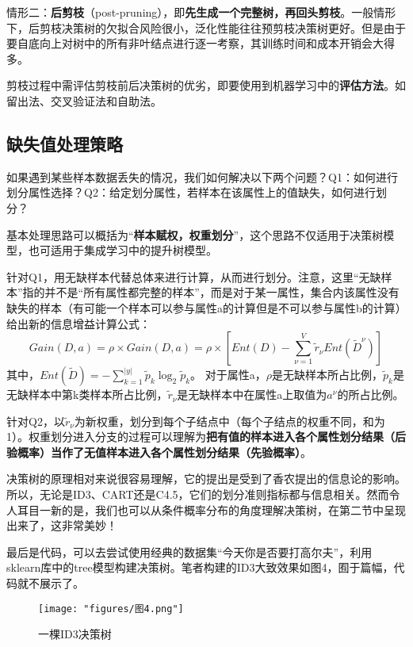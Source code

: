 情形二：\textbf{后剪枝}（post-pruning），即\textbf{先生成一个完整树，再回头剪枝}。一般情形下，后剪枝决策树的欠拟合风险很小，泛化性能往往预剪枝决策树更好。但是由于要自底向上对树中的所有非叶结点进行逐一考察，其训练时间和成本开销会大得多。

剪枝过程中需评估剪枝前后决策树的优劣，即要使用到机器学习中的\textbf{评估方法}。如留出法、交叉验证法和自助法。
\subsection{缺失值处理策略}
如果遇到某些样本数据丢失的情况，我们如何解决以下两个问题？Q1：如何进行划分属性选择？Q2：给定划分属性，若样本在该属性上的值缺失，如何进行划分？

基本处理思路可以概括为“\textbf{样本赋权，权重划分}”，这个思路不仅适用于决策树模型，也可适用于集成学习中的提升树模型。  

针对Q1，用无缺样本代替总体来进行计算，从而进行划分。注意，这里“无缺样本”指的并不是“所有属性都完整的样本”，而是对于某一属性，集合内该属性没有缺失的样本（有可能一个样本可以参与属性a的计算但是不可以参与属性b的计算）给出新的信息增益计算公式：
\begin{equation}Gain(D,a)=\rho\times Gain(D,a)=\rho\times[Ent(D)-\sum_{\nu=1}^V\tilde{r}_\nu Ent(\tilde{D}^\nu)]\end{equation}
其中，$Ent(\tilde{D})=-\sum_{k=1}^{|y|}\widetilde{p}_k\log_2\widetilde{p}_k$。
对于属性a，$\rho $是无缺样本所占比例，$\tilde{p}_{k}$是无缺样本中第k类样本所占比例，$\tilde{r}_{\nu}$是无缺样本中在属性a上取值为$a^{\nu}$的所占比例。

针对Q2，以$\tilde{r}_{\nu}$为新权重，划分到每个子结点中（每个子结点的权重不同，和为1）。权重划分进入分支的过程可以理解为\textbf{把有值的样本进入各个属性划分结果（后验概率）当作了无值样本进入各个属性划分结果（先验概率）}。


决策树的原理相对来说很容易理解，它的提出是受到了香农提出的信息论的影响。所以，无论是ID3、CART还是C4.5，它们的划分准则指标都与信息相关。然而令人耳目一新的是，我们也可以从条件概率分布的角度理解决策树，在第二节中呈现出来了，这非常美妙！

最后是代码，可以去尝试使用经典的数据集“今天你是否要打高尔夫”，利用sklearn库中的tree模型构建决策树。笔者构建的ID3大致效果如图4，囿于篇幅，代码就不展示了。
\begin{figure}[ht] %
	\centering
	\texttt{[image: "figures/图4.png"]} %
	\caption{一棵ID3决策树} %
	\label{fig:example} %
\end{figure}